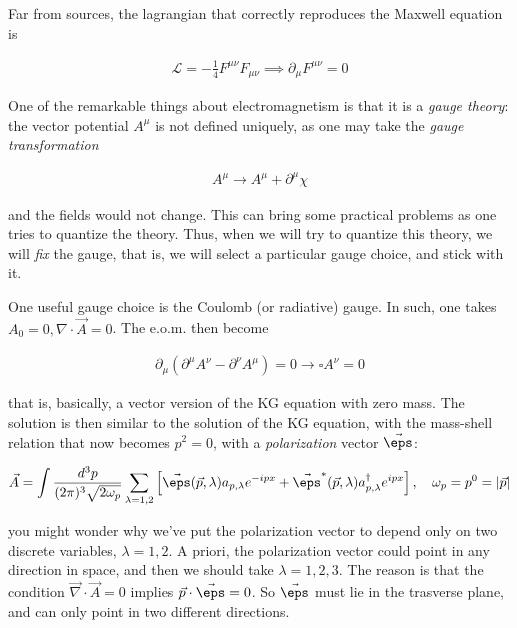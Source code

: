 \documentclass{report}
\begin{document}
Far from sources, the lagrangian that correctly reproduces the Maxwell equation is 

\begin{align}
    \mathcal{L} = -\frac{1}{4}F^{\mu\nu}F_{\mu\nu} \implies \partial_\mu F^{\mu\nu} = 0
\end{align}

One of the remarkable things about electromagnetism is that it is a \emph{gauge theory}: the vector potential \(A^\mu\) is not defined uniquely, as one may take the \emph{gauge transformation} 

\begin{align}
    A^\mu \rightarrow A^\mu + \partial^\mu \chi
\end{align}

and the fields would not change. This can bring some practical problems as one tries to quantize the theory. Thus, when we will try to quantize this theory, we will \emph{fix} the gauge, that is, we will select a particular gauge choice, and stick with it. 

One useful gauge choice is the Coulomb (or radiative) gauge. In such, one takes \(A_0 = 0, \nabla \cdot \vec{A} = 0\). The e.o.m. then become 

\begin{align}
    \partial_\mu (\partial^\mu A^\nu - \partial^\nu A^\mu) = 0 \rightarrow \square A^\nu = 0
\end{align}

that is, basically, a vector version of the KG equation with zero mass. The solution is then similar to the solution of the KG equation, with the mass-shell relation that now becomes \(p^2 = 0\), with a \emph{polarization} vector \(\vec{\eps}\): 

\begin{align}
    \vec{A} = \int\frac{d^3p}{(2\pi)^3\sqrt{2\omega_p}}\sum_{\lambda = 1, 2}\left[\vec{\eps}(\vec{p}, \lambda)a_{p, \lambda}e^{-ipx} + \vec{\eps}^*(\vec{p}, \lambda)a^\dagger_{p,\lambda}e^{ipx} \right], \quad \omega_p = p^0 = \abs{\vec{p}}
\end{align}

you might wonder why we've put the polarization vector to depend only on two discrete variables, \(\lambda = 1,2\). A priori, the polarization vector could point in any direction in space, and then we should take \(\lambda = 1, 2, 3\). The reason is that the condition \(\vec{\nabla}\cdot \vec{A} = 0\) implies \(\vec{p}\cdot \vec{\eps} = 0\). So \(\vec{\eps}\) must lie in the trasverse plane, and can only point in two different directions. 
\end{document}
